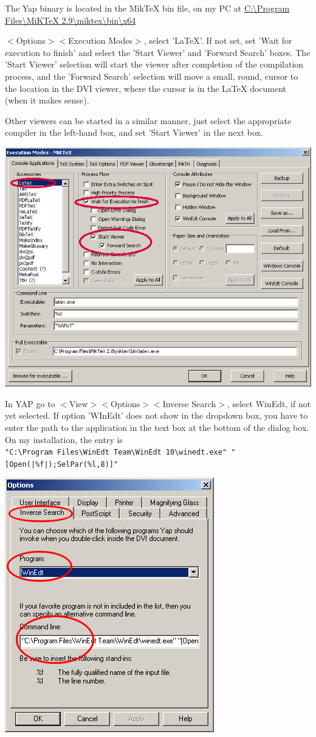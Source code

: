 The Yap binary is located in the MikTeX bin file, on my PC at
\url{C:\Program Files\MiKTeX 2.9\miktex\bin\x64}

$<$Options$>$$<$Execution Modes$>$, select 'LaTeX'. If not set, set 'Wait for execution to finish' and select the 'Start Viewer' and 'Forward Search' boxes. The 'Start Viewer' selection will start the viewer after completion of the compilation process, and the 'Forward Search' selection will move a small, round, cursor to the location in the DVI viewer, where the cursor is in the LaTeX document (when it makes sense).

Other viewers can be started in a similar manner, just select the appropriate compiler in the left-hand box, and set 'Start Viewer' in the next box.


\centerline{\includegraphics[bb= 0 0 696 543, width=\textwidth]{eps/StartViewer.png}}

In YAP go to  $<$View$>$$<$Options$>$$<$Inverse Search$>$, select WinEdt, if not yet selected. If option 'WInEdt' does not show in the dropdown box,  you have to enter the path to the application in the text box at the bottom of the dialog box.  On my installation, the entry is	\\
{\small \verb+"C:\Program Files\WinEdt Team\WinEdt 10\winedt.exe" "[Open(|%f|);SelPar(%l,8)]"+}

\centerline{\includegraphics[bb= 0 0 344 416, width=.6\textwidth]{eps/yapinverse.png}}


